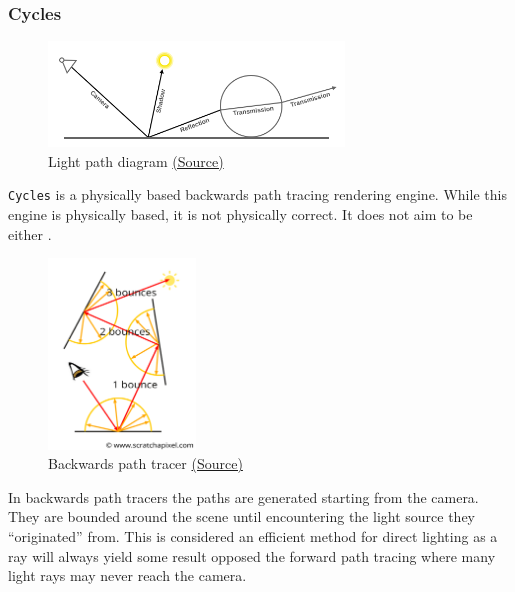 \documentclass[11pt]{article}
\begin{document}
\subsubsection{Cycles}
\label{sec:orga01576c}
\begin{figure}[htbp]
\centering
\includegraphics[width=0.7\textwidth]{Images/render_cycles_render-settings_light-paths_rays.png}
\caption{\label{light-path}Light path diagram \href{https://docs.blender.org/manual/en/latest/render/cycles/render\_settings/light\_paths.html}{(Source)}}
\end{figure}
\texttt{Cycles} is a physically based backwards path tracing rendering engine. While
this engine is  physically based, it is not physically correct. It does not aim
to be either \cite{design-goals}.\\

\newpage
\begin{figure}
\centering
\includegraphics[width=0.35\textwidth]{Images/shad2-globalillum1a.png}
\caption{Backwards path tracer \href{https://www.scratchapixel.com/lessons/3d-basic-rendering/global-illumination-path-tracing}{(Source)}}
\end{figure}
In backwards path tracers the paths are generated starting from the camera. They
are bounded around the scene until encountering the light source they ``originated'' from.
This is considered an efficient method for direct lighting as a ray will always
yield some result opposed the forward path tracing where many light rays may
never reach the camera.\\
\end{document}
